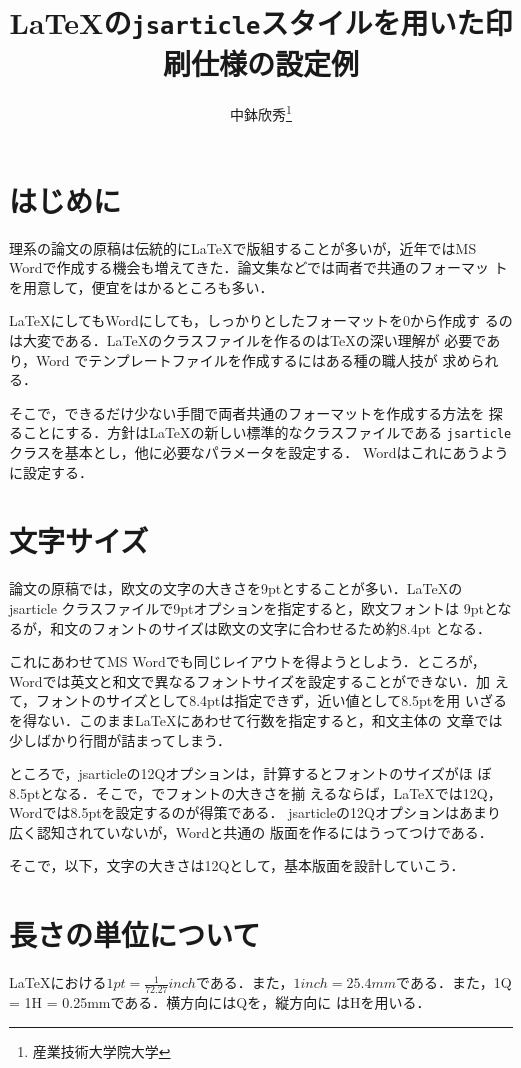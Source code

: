 \documentclass[a4j, 12Q, twocolumn, twoside]{jsarticle}
\title{\LaTeX の\texttt{jsarticle}スタイルを用いた印刷仕様の設定例}
\author{中鉢欣秀\thanks{産業技術大学院大学}}
\begin{document}
\maketitle

\section{はじめに}
  理系の論文の原稿は伝統的に\LaTeX で版組することが多いが，近年ではMS
  Wordで作成する機会も増えてきた．論文集などでは両者で共通のフォーマッ
  トを用意して，便宜をはかるところも多い．

  \LaTeX にしてもWordにしても，しっかりとしたフォーマットを0から作成す
  るのは大変である．\LaTeX のクラスファイルを作るのは\TeX の深い理解が
  必要であり，Word でテンプレートファイルを作成するにはある種の職人技が
  求められる．

  そこで，できるだけ少ない手間で両者共通のフォーマットを作成する方法を
  探ることにする．方針は\LaTeX の新しい標準的なクラスファイルである
  \texttt{jsarticle}クラスを基本とし，他に必要なパラメータを設定する．
  Wordはこれにあうように設定する．

\section{文字サイズ}

  論文の原稿では，欧文の文字の大きさを9ptとすることが多い．\LaTeX の
  jsarticle クラスファイルで9ptオプションを指定すると，欧文フォントは
  9ptとなるが，和文のフォントのサイズは欧文の文字に合わせるため約8.4pt
  となる．

  これにあわせてMS Wordでも同じレイアウトを得ようとしよう．ところが，
  Wordでは英文と和文で異なるフォントサイズを設定することができない．加
  えて，フォントのサイズとして8.4ptは指定できず，近い値として8.5ptを用
  いざるを得ない．このまま\LaTeX にあわせて行数を指定すると，和文主体の
  文章では少しばかり行間が詰まってしまう．

  ところで，jsarticleの12Qオプションは，計算するとフォントのサイズがほ
  ぼ8.5ptとなる．そこで，でフォントの大きさを揃
  えるならば，\LaTeX では12Q，Wordでは8.5ptを設定するのが得策である．
  jsarticleの12Qオプションはあまり広く認知されていないが，Wordと共通の
  版面を作るにはうってつけである．

  そこで，以下，文字の大きさは12Qとして，基本版面を設計していこう．

\section{長さの単位について}
  \LaTeX における$1 pt = \frac{1}{72.27} inch$である．また，$1 inch =
  25.4 mm$である．また，1Q = 1H = 0.25mmである．横方向にはQを，縦方向に
  はHを用いる．
\end{document}
